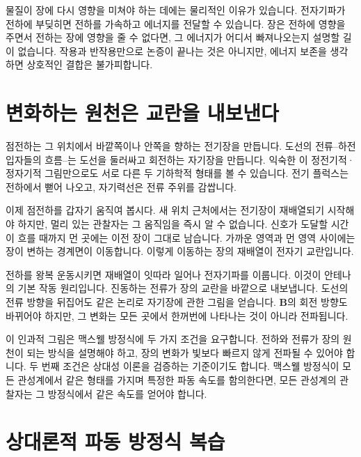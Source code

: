 물질이 장에 다시 영향을 미쳐야 하는 데에는 물리적인 이유가 있습니다. 전자기파가 전하에 부딪히면 전하를 가속하고 에너지를 전달할 수 있습니다. 장은 전하에 영향을 주면서 전하는 장에 영향을 줄 수 없다면, 그 에너지가 어디서 빠져나오는지 설명할 길이 없습니다. 작용과 반작용만으로 논증이 끝나는 것은 아니지만, 에너지 보존을 생각하면 상호적인 결합은 불가피합니다.

\section{변화하는 원천은 교란을 내보낸다}

점전하는 그 위치에서 바깥쪽이나 안쪽을 향하는 전기장을 만듭니다. 도선의 전류--하전 입자들의 흐름--는 도선을 둘러싸고 회전하는 자기장을 만듭니다. 익숙한 이 정전기적·정자기적 그림만으로도 서로 다른 두 기하학적 형태를 볼 수 있습니다. 전기 플럭스는 전하에서 뻗어 나오고, 자기력선은 전류 주위를 감쌉니다.

이제 점전하를 갑자기 움직여 봅시다. 새 위치 근처에서는 전기장이 재배열되기 시작해야 하지만, 멀리 있는 관찰자는 그 움직임을 즉시 알 수 없습니다. 신호가 도달할 시간이 흐를 때까지 먼 곳에는 이전 장이 그대로 남습니다. 가까운 영역과 먼 영역 사이에는 장이 변하는 경계면이 이동합니다. 이렇게 이동하는 장의 재배열이 전자기 교란입니다.

전하를 왕복 운동시키면 재배열이 잇따라 일어나 전자기파를 이룹니다. 이것이 안테나의 기본 작동 원리입니다. 진동하는 전류가 장의 교란을 바깥으로 내보냅니다. 도선의 전류 방향을 뒤집어도 같은 논리로 자기장에 관한 그림을 얻습니다. \(\mathbf B\)의 회전 방향도 바뀌어야 하지만, 그 변화는 모든 곳에서 한꺼번에 나타나는 것이 아니라 전파됩니다.

이 인과적 그림은 맥스웰 방정식에 두 가지 조건을 요구합니다. 전하와 전류가 장의 원천이 되는 방식을 설명해야 하고, 장의 변화가 빛보다 빠르지 않게 전파될 수 있어야 합니다. 두 번째 조건은 상대성 이론을 검증하는 기준이기도 합니다. 맥스웰 방정식이 모든 관성계에서 같은 형태를 가지며 특정한 파동 속도를 함의한다면, 모든 관성계의 관찰자는 그 방정식에서 같은 속도를 얻어야 합니다.

\section{상대론적 파동 방정식 복습}

